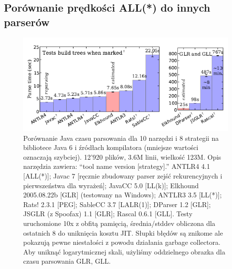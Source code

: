 \subsection{Porównanie prędkości ALL(*) do innych parserów}
\begin{figure}[h]
\includegraphics[scale=0.67]{Figure9.png}
\caption{
Porównanie Java czasu parsowania dla 10 narzędzi i 8 strategii na
bibliotece Java 6 i źródłach kompilatora (mniejsze wartości oznaczają szybciej).
12'920 plików, 3.6M linii, wielkość 123M.
Opis narzędzia zawiera: “tool name version [strategy].” ANTLR4 4.1 [ALL(*)]; Javac
7 [ręcznie zbudowany parser zejść rekurencyjnych i pierwszeństwa dla wyrażeń];
JavaCC 5.0 [LL(k)]; Elkhound 2005.08.22b [GLR] (testowany na Windows); ANTLR3 3.5 [LL(*)];
Rats! 2.3.1 [PEG]; SableCC 3.7
[LALR(1)]; DParser 1.2 [GLR]; JSGLR (z Spoofax) 1.1 [GLR];
Rascal 0.6.1 [GLL]. Testy uruchomione 10x z obfitą pamięcią, średnia/stddev
obliczona dla ostatnich 8 do uniknięcia kosztu JIT. Słupki błędów są znikome
ale pokazują pewne niestałości z powodu działania garbage collectora.
Aby uniknąć logarytmicznej skali, użyliśmy oddzielnego obrazka dla czasu parsowania GLR, GLL.
}
\end{figure}

